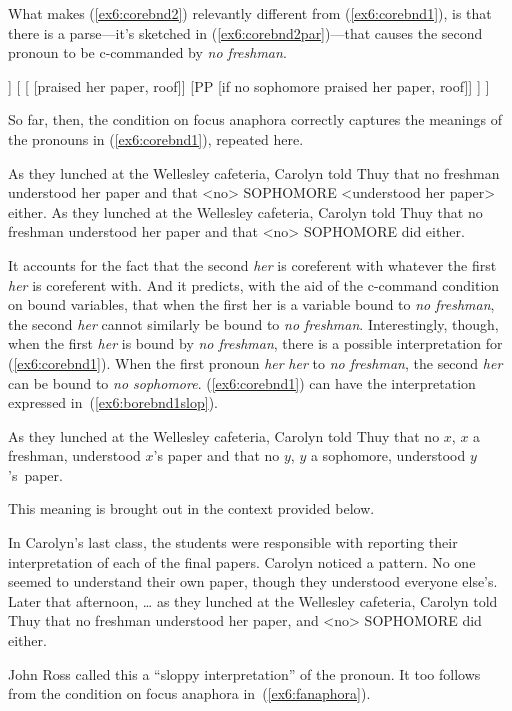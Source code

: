 What makes (\ref{ex6:corebnd2}) relevantly different from (\ref{ex6:corebnd1}), is that there is a parse---it's sketched in (\ref{ex6:corebnd2par})---that causes the second pronoun to be c-commanded by \emph{no freshman}.
\begin{exe}
	\raggedright
	\ex \label{ex6:corebnd2par}
	\small
\begin{forest}
[vP
	[DP [no freshman, roof]]
	[ 
		[ [praised her paper, roof]]
		[PP [if no sophomore praised her paper, roof]]
	]
]
\end{forest}
\end{exe}

So far, then, the condition on focus anaphora correctly captures the meanings of the pronouns in (\ref{ex6:corebnd1}), repeated here.
\begin{exe}
	\raggedright
	\begin{xlist}
	\ex As they lunched at the Wellesley cafeteria, Carolyn told Thuy that no freshman understood her paper and that <no> SOPHOMORE <understood her paper> either.
	\ex As they lunched at the Wellesley cafeteria, Carolyn told Thuy that no freshman understood her paper and that <no> SOPHOMORE did either.
	\end{xlist}
\end{exe}
It accounts for the fact that the second \textit{her} is coreferent with whatever the first \textit{her} is coreferent with. And it predicts, with the aid of the c-command condition on bound variables, that when the first her is a variable bound to \emph{no freshman}, the second \textit{her} cannot similarly be bound to \emph{no freshman}. Interestingly, though, when the first \textit{her} is bound by \emph{no freshman}, there is a possible interpretation for (\ref{ex6:corebnd1}). When the first pronoun \textit{her} \textit{her} to \emph{no freshman}, the second \textit{her} can be bound to \emph{no sophomore}. (\ref{ex6:corebnd1}) can have the interpretation expressed in~(\ref{ex6:borebnd1slop}).
\begin{exe}
	\raggedright
	\ex \label{ex6:borebnd1slop}
	As they lunched at the Wellesley cafeteria, Carolyn told Thuy that no $x$, $x$ a freshman, understood $x$'s paper and that no $y$, $y$ a sophomore, understood $y$'s~paper.
\end{exe}
This meaning is brought out in the context provided below.
\begin{exe}
	\raggedright
	\sn In Carolyn's last class, the students were responsible with reporting their interpretation of each of the final papers. Carolyn noticed a pattern. No one seemed to understand their own paper, though they understood everyone else's. Later that afternoon, \ldots
	\ex \label{ex6:slopcon} as they lunched at the Wellesley cafeteria, Carolyn told Thuy that no freshman understood her paper, and <no> SOPHOMORE did either.
\end{exe}
John Ross\cite{Ross:1967} called this a ``sloppy interpretation'' of the pronoun. It too follows from the condition on focus anaphora in~(\ref{ex6:fanaphora}).

